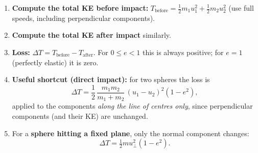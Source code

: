 \documentclass[11pt]{article}
\begin{document}
\begin{methode}
\begin{enumerate}
\item \textbf{Compute the total KE before impact:} $T_{\text{before}} = \tfrac{1}{2}m_1 u_1^2 + \tfrac{1}{2}m_2 u_2^2$ (use full speeds, including perpendicular components).
\item \textbf{Compute the total KE after impact} similarly.
\item \textbf{Loss:} $\Delta T = T_{\text{before}} - T_{\text{after}}$. For $0 \le e < 1$ this is always positive; for $e = 1$ (perfectly elastic) it is zero.
\item \textbf{Useful shortcut (direct impact):} for two spheres the loss is
\[ \Delta T = \frac{1}{2}\,\frac{m_1 m_2}{m_1 + m_2}\,(u_1 - u_2)^2 (1 - e^2), \]
applied to the components \emph{along the line of centres only}, since perpendicular components (and their KE) are unchanged.
\item For a \textbf{sphere hitting a fixed plane}, only the normal component changes:
\[ \Delta T = \tfrac{1}{2} m u_{\perp}^2 (1 - e^2). \]
\end{enumerate}
\end{methode}
\end{document}

